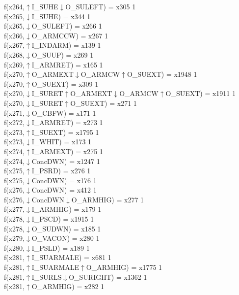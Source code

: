 f(x264,$\uparrow$I\_SUHE$\downarrow$O\_SULEFT) = x305 {1} \\
f(x265,$\downarrow$I\_SUHE) = x344 {1} \\
f(x265,$\downarrow$O\_SULEFT) = x266 {1} \\
f(x266,$\downarrow$O\_ARMCCW) = x267 {1} \\
f(x267,$\uparrow$I\_INDARM) = x139 {1} \\
f(x268,$\downarrow$O\_SUUP) = x269 {1} \\
f(x269,$\uparrow$I\_ARMRET) = x165 {1} \\
f(x270,$\uparrow$O\_ARMEXT$\downarrow$O\_ARMCW$\uparrow$O\_SUEXT) = x1948 {1} \\
f(x270,$\uparrow$O\_SUEXT) = x309 {1} \\
f(x270,$\downarrow$I\_SURET$\uparrow$O\_ARMEXT$\downarrow$O\_ARMCW$\uparrow$O\_SUEXT) = x1911 {1} \\
f(x270,$\downarrow$I\_SURET$\uparrow$O\_SUEXT) = x271 {1} \\
f(x271,$\downarrow$O\_CBFW) = x171 {1} \\
f(x272,$\downarrow$I\_ARMRET) = x273 {1} \\
f(x273,$\uparrow$I\_SUEXT) = x1795 {1} \\
f(x273,$\downarrow$I\_WHIT) = x173 {1} \\
f(x274,$\uparrow$I\_ARMEXT) = x275 {1} \\
f(x274,$\downarrow$ConcDWN) = x1247 {1} \\
f(x275,$\uparrow$I\_PSRD) = x276 {1} \\
f(x275,$\downarrow$ConcDWN) = x176 {1} \\
f(x276,$\downarrow$ConcDWN) = x412 {1} \\
f(x276,$\downarrow$ConcDWN$\downarrow$O\_ARMHIG) = x277 {1} \\
f(x277,$\downarrow$I\_ARMHIG) = x179 {1} \\
f(x278,$\downarrow$I\_PSCD) = x1915 {1} \\
f(x278,$\downarrow$O\_SUDWN) = x185 {1} \\
f(x279,$\downarrow$O\_VACON) = x280 {1} \\
f(x280,$\downarrow$I\_PSLD) = x189 {1} \\
f(x281,$\uparrow$I\_SUARMALE) = x681 {1} \\
f(x281,$\uparrow$I\_SUARMALE$\uparrow$O\_ARMHIG) = x1775 {1} \\
f(x281,$\uparrow$I\_SURLS$\downarrow$O\_SURIGHT) = x1362 {1} \\
f(x281,$\uparrow$O\_ARMHIG) = x282 {1} \\
